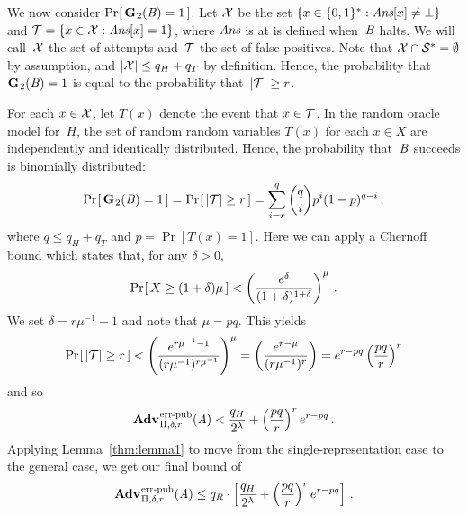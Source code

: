We now consider $\Pr\hspace{-1pt}\left[\,\textup{\textbf{G}}\hspace{0.5pt}_2(\mathit{B})=1\,\right]$.
%
Let $\mathcal{X}$ be the set $\{ x \in \{0,1\}^* : \textit{Ans}[x] \ne \bot \}$ and $\mathcal{T} = \{x
\in\mathcal{X}: \textit{Ans}[x] = 1\}$, where $\textit{Ans}$ is at is defined when~$\mathit{B}$ halts. We
will call~$\mathcal{X}$ the set of attempts and~$\mathcal{T}$ the set of false positives.
%
Note that $\mathcal{X}\cap\mathcal{S}^*=\emptyset$ by assumption, and
$|\mathcal{X}| \leq q_H + q_T$ by definition.
%
Hence, the probability that~$\textup{\textbf{G}}\hspace{0.5pt}_2(\mathit{B})=1$ is equal to the probability
that~$|\mathcal{T}| \geq r$.

For each $x\in\mathcal{X}$, let $T(x)$ denote the event that $x\in\mathcal{T}$.
%
In the random oracle model for~$H$, the set of random random variables $T(x)$
for each $x\in X$ are independently and identically distributed.
%
Hence, the probability that~$\mathit{B}$ succeeds is binomially distributed:
%
\begin{equation}
   \Pr\hspace{-1pt}\left[\,\textup{\textbf{G}}\hspace{0.5pt}_2(\mathit{B})=1\,\right] = \Pr\hspace{-1pt}\left[\, |\mathcal{T}| \geq r \,\right] =
     \sum_{i=r}^{q} \binom{q}{i}p^i(1-p)^{q-i} \,,
\end{equation}
%
where $q \leq q_H + q_T$ and $p = \Pr[T(x)=1]$. Here we can apply a Chernoff
bound which states that, for any $\delta > 0$,
%
\begin{equation}
  \Pr\hspace{-1pt}\left[\,X \geq (1+\delta)\mu\,\right] < \left(\frac{e^\delta}{(1+\delta)^{1+\delta}}\right)^\mu
  \,.
\end{equation}
%
We set $\delta = r\mu^{-1}-1$ and note that $\mu = pq$.
This yields
%
\begin{equation}
 \Pr\hspace{-1pt}\left[\,|\mathcal{T}| \geq r\,\right] < \left(\frac{e^{r\mu^{-1}-1}}{(r\mu^{-1})^{r\mu^{-1}}}\right)^\mu = \left(\frac{e^{r-\mu}}{(r\mu^{-1})^r}\right) = e^{r-pq}\left(\frac{pq}{r}\right)^r
\end{equation}
%
and so
%
\begin{equation}
  \Adv{\errep}_{\Pi,\delta,r}(\advA) < \frac{q_H}{2^\lambda} + \left(\frac{pq}{r}\right)^re^{r-pq}
  \,.
\end{equation}
%
Applying Lemma~\ref{thm:lemma1} to move from the single-representation case to the
general case, we get our final bound of
\begin{equation}
  \Adv{\errep}_{\Pi,\delta,r}(\advA) \leq
    q_R \cdot \left[
      \frac{q_H}{2^\lambda} +
      \left(\frac{pq}{r}\right)^re^{r-pq}
    \right] \,.
\end{equation}
